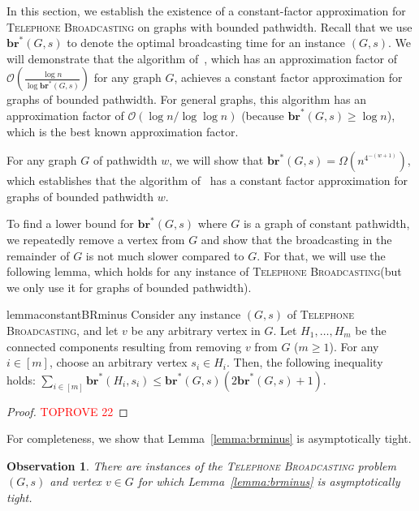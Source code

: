 \documentclass[letterpaper,11pt]{article}
\newtheorem{observation}{Observation}[section]
\newcommand{\bropt}{{\boldsymbol{br}^*}}
\newcommand{\oh}{\mathcal{O}}
\newcommand{\telebr}{\textsc{Telephone Broadcasting}\xspace}
\newcommand{\pwidth}{w}
\begin{document}
In this section, we establish the existence of a constant-factor approximation for \telebr on graphs with bounded pathwidth. Recall that we use $\bropt(G,s)$
to denote the optimal broadcasting time for an instance $(G,s)$. We will demonstrate that the algorithm of~\citet{elkin2006sublogarithmic}, which has an approximation factor of $\oh\left(\frac{\log n}{\log \bropt(G, s)}\right)$ for any graph $G$, achieves a constant factor approximation for graphs of bounded pathwidth. For general graphs, this algorithm has an approximation factor of $\oh(\log n/ \log \log n)$ (because $\bropt(G,s)\geq  \log n$), which is the best known approximation factor.  

For any graph $G$ of pathwidth $\pwidth$, we will show that $\bropt(G,s) = \Omega(n^{4^{-(\pwidth+1)}})$, which establishes that the algorithm of~\citet{elkin2006sublogarithmic} has a constant factor approximation for graphs of bounded pathwidth $\pwidth$.



To find a lower bound for $\bropt(G,s)$ where $G$ is a graph of constant pathwidth, we repeatedly remove a vertex from $G$ and show that the broadcasting in the remainder of $G$ is not much slower compared to $G$. For that, we will use the following lemma, which holds for any instance of \telebr (but we only use it for graphs of bounded pathwidth). 

\begin{restatable}{lemma}{constantBRminus}\label{lemma:brminus}
Consider any instance $(G,s)$ of \telebr, and let $v$ be any arbitrary vertex in $G$. Let $H_1,\ldots, H_m$ be the connected components resulting from removing $v$ from $G$ ($m\geq 1$). 
For any $i \in [m]$, choose an arbitrary vertex $s_i\in H_i$.
Then, the following inequality holds: $\sum_{i\in[m]} \bropt(H_i, s_i) \leq \bropt(G,s)(2\bropt(G,s) + 1)$.
\end{restatable}




\begin{proof}\textcolor{red}{TOPROVE 22}\end{proof}

For completeness, we show that Lemma~\ref{lemma:brminus} is asymptotically tight. 

\begin{observation}\label{observation:tighti}
    There are instances of the \telebr problem $(G,s)$ and vertex $v \in G$ for which Lemma~\ref{lemma:brminus} is asymptotically tight.
\end{observation}
\end{document}

